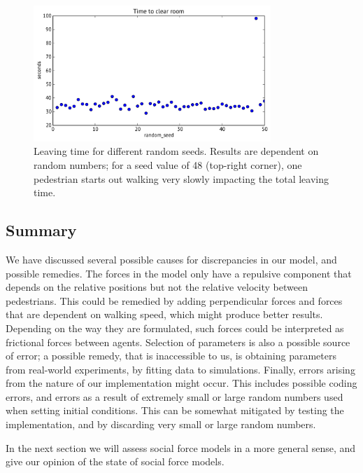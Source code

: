 \begin{figure}[h]
    \centering
    \includegraphics[width=0.8\textwidth]{Figures/random-seed-variations.pdf}
    \caption[Leaving time for different random seeds]{Leaving time for 
    different random seeds. Results are dependent on random numbers; for a 
    seed value of 48 (top-right corner), one pedestrian starts out walking 
    very slowly impacting the total leaving time.}
    \label{fig:random-seed}
\end{figure}


\subsection{Summary}
We have discussed several possible causes for discrepancies in our model, and 
possible remedies. The forces in the model only have a repulsive component 
that depends on the relative positions but not the relative velocity between 
pedestrians.  This could be remedied by adding perpendicular forces and forces 
that are dependent on walking speed, which might produce better results. 
Depending on the way they are formulated, such forces could be interpreted as 
frictional forces between agents. Selection of parameters is also a possible 
source of error; a possible remedy, that is inaccessible to us, is obtaining 
parameters from real-world experiments, by fitting data to simulations. 
Finally, errors arising from the nature of our implementation might occur. 
This includes possible coding errors, and errors as a result of extremely 
small or large random numbers used when setting initial conditions. This can 
be somewhat mitigated by testing the implementation, and by discarding very 
small or large random numbers.

In the next section we will assess social force models in a more general 
sense, and give our opinion of the state of social force models.
